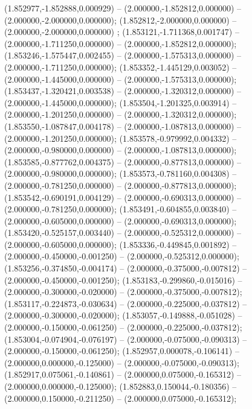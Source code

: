  (1.852977,-1.852888,0.000929) -- (2.000000,-1.852812,0.000000) -- (2.000000,-2.000000,0.000000);
 (1.852812,-2.000000,0.000000) -- (2.000000,-2.000000,0.000000) ;
 (1.853121,-1.711368,0.001747) -- (2.000000,-1.711250,0.000000) -- (2.000000,-1.852812,0.000000);
 (1.853246,-1.575447,0.002455) -- (2.000000,-1.575313,0.000000) -- (2.000000,-1.711250,0.000000);
 (1.853352,-1.445129,0.003052) -- (2.000000,-1.445000,0.000000) -- (2.000000,-1.575313,0.000000);
 (1.853437,-1.320421,0.003538) -- (2.000000,-1.320312,0.000000) -- (2.000000,-1.445000,0.000000);
 (1.853504,-1.201325,0.003914) -- (2.000000,-1.201250,0.000000) -- (2.000000,-1.320312,0.000000);
 (1.853550,-1.087847,0.004178) -- (2.000000,-1.087813,0.000000) -- (2.000000,-1.201250,0.000000);
 (1.853578,-0.979992,0.004332) -- (2.000000,-0.980000,0.000000) -- (2.000000,-1.087813,0.000000);
 (1.853585,-0.877762,0.004375) -- (2.000000,-0.877813,0.000000) -- (2.000000,-0.980000,0.000000);
 (1.853573,-0.781160,0.004308) -- (2.000000,-0.781250,0.000000) -- (2.000000,-0.877813,0.000000);
 (1.853542,-0.690191,0.004129) -- (2.000000,-0.690313,0.000000) -- (2.000000,-0.781250,0.000000);
 (1.853491,-0.604855,0.003840) -- (2.000000,-0.605000,0.000000) -- (2.000000,-0.690313,0.000000);
 (1.853420,-0.525157,0.003440) -- (2.000000,-0.525312,0.000000) -- (2.000000,-0.605000,0.000000);
 (1.853336,-0.449845,0.001892) -- (2.000000,-0.450000,-0.001250) -- (2.000000,-0.525312,0.000000);
 (1.853256,-0.374850,-0.004174) -- (2.000000,-0.375000,-0.007812) -- (2.000000,-0.450000,-0.001250);
 (1.853183,-0.299860,-0.015016) -- (2.000000,-0.300000,-0.020000) -- (2.000000,-0.375000,-0.007812);
 (1.853117,-0.224873,-0.030634) -- (2.000000,-0.225000,-0.037812) -- (2.000000,-0.300000,-0.020000);
 (1.853057,-0.149888,-0.051028) -- (2.000000,-0.150000,-0.061250) -- (2.000000,-0.225000,-0.037812);
 (1.853004,-0.074904,-0.076197) -- (2.000000,-0.075000,-0.090313) -- (2.000000,-0.150000,-0.061250);
 (1.852957,0.000078,-0.106141) -- (2.000000,0.000000,-0.125000) -- (2.000000,-0.075000,-0.090313);
 (1.852917,0.075061,-0.140861) -- (2.000000,0.075000,-0.165312) -- (2.000000,0.000000,-0.125000);
 (1.852883,0.150044,-0.180356) -- (2.000000,0.150000,-0.211250) -- (2.000000,0.075000,-0.165312);
